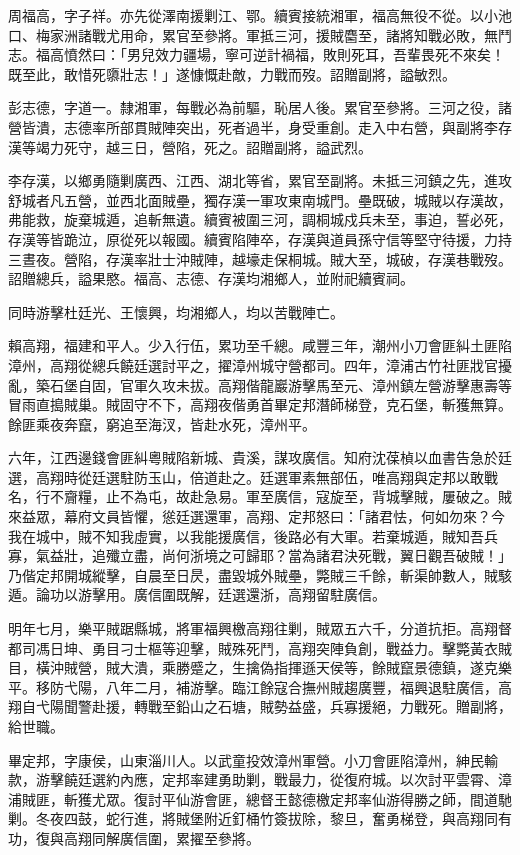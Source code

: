 \begin{pinyinscope}
周福高，字子祥。亦先從澤南援剿江、鄂。續賓接統湘軍，福高無役不從。以小池口、梅家洲諸戰尤用命，累官至參將。軍抵三河，援賊麕至，諸將知戰必敗，無鬥志。福高憤然曰：「男兒效力疆場，寧可逆計禍福，敗則死耳，吾輩畏死不來矣！既至此，敢惜死隳壯志！」遂慷慨赴敵，力戰而歿。詔贈副將，謚敏烈。

彭志德，字道一。隸湘軍，每戰必為前驅，恥居人後。累官至參將。三河之役，諸營皆潰，志德率所部貫賊陣突出，死者過半，身受重創。走入中右營，與副將李存漢等竭力死守，越三日，營陷，死之。詔贈副將，謚武烈。

李存漢，以鄉勇隨剿廣西、江西、湖北等省，累官至副將。未抵三河鎮之先，進攻舒城者凡五營，並西北面賊壘，獨存漢一軍攻東南城門。壘既破，城賊以存漢故，弗能救，旋棄城遁，追斬無遺。續賓被圍三河，調桐城戍兵未至，事迫，誓必死，存漢等皆跪泣，原從死以報國。續賓陷陣卒，存漢與道員孫守信等堅守待援，力持三晝夜。營陷，存漢率壯士沖賊陣，越壕走保桐城。賊大至，城破，存漢巷戰歿。詔贈總兵，謚果愍。福高、志德、存漢均湘鄉人，並附祀續賓祠。

同時游擊杜廷光、王懷興，均湘鄉人，均以苦戰陣亡。

賴高翔，福建和平人。少入行伍，累功至千總。咸豐三年，潮州小刀會匪糾土匪陷漳州，高翔從總兵饒廷選討平之，擢漳州城守營都司。四年，漳浦古竹社匪戕官擾亂，築石堡自固，官軍久攻未拔。高翔偕龍巖游擊馬至元、漳州鎮左營游擊惠壽等冒雨直搗賊巢。賊固守不下，高翔夜偕勇首畢定邦潛師梯登，克石堡，斬獲無算。餘匪乘夜奔竄，窮追至海汊，皆赴水死，漳州平。

六年，江西邊錢會匪糾粵賊陷新城、貴溪，謀攻廣信。知府沈葆楨以血書告急於廷選，高翔時從廷選駐防玉山，倍道赴之。廷選軍素無部伍，唯高翔與定邦以敢戰名，行不齎糧，止不為屯，故赴急易。軍至廣信，寇旋至，背城擊賊，屢破之。賊來益眾，幕府文員皆懼，慫廷選還軍，高翔、定邦怒曰：「諸君怯，何如勿來？今我在城中，賊不知我虛實，以我能援廣信，後路必有大軍。若棄城遁，賊知吾兵寡，氣益壯，追殲立盡，尚何浙境之可歸耶？當為諸君決死戰，翼日觀吾破賊！」乃偕定邦開城縱擊，自晨至日昃，盡毀城外賊壘，斃賊三千餘，斬渠帥數人，賊駭遁。論功以游擊用。廣信圍既解，廷選還浙，高翔留駐廣信。

明年七月，樂平賊踞縣城，將軍福興檄高翔往剿，賊眾五六千，分道抗拒。高翔督都司馮日坤、勇目刁士樞等迎擊，賊殊死鬥，高翔突陣負創，戰益力。擊斃黃衣賊目，橫沖賊營，賊大潰，乘勝蹙之，生擒偽指揮遜天侯等，餘賊竄景德鎮，遂克樂平。移防弋陽，八年二月，補游擊。臨江餘寇合撫州賊趨廣豐，福興退駐廣信，高翔自弋陽聞警赴援，轉戰至鉛山之石塘，賊勢益盛，兵寡援絕，力戰死。贈副將，給世職。

畢定邦，字康侯，山東淄川人。以武童投效漳州軍營。小刀會匪陷漳州，紳民輸款，游擊饒廷選約內應，定邦率建勇助剿，戰最力，從復府城。以次討平雲霄、漳浦賊匪，斬獲尤眾。復討平仙游會匪，總督王懿德檄定邦率仙游得勝之師，間道馳剿。冬夜四鼓，蛇行進，將賊堡附近釘桶竹簽拔除，黎旦，奮勇梯登，與高翔同有功，復與高翔同解廣信圍，累擢至參將。


\end{pinyinscope}
